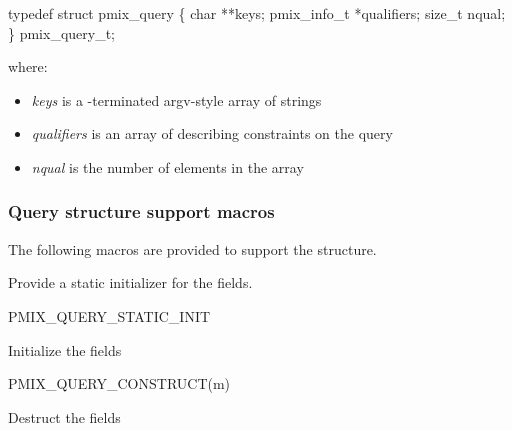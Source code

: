 \cspecificstart
\begin{codepar}
typedef struct pmix_query \{
    char **keys;
    pmix_info_t *qualifiers;
    size_t nqual;
\} pmix_query_t;
\end{codepar}
\cspecificend

where:

\begin{itemize}
    \item \emph{keys} is a -terminated argv-style array of strings
    \item \emph{qualifiers} is an array of  describing constraints on the query
    \item \emph{nqual} is the number of elements in the  array
\end{itemize}

\subsubsection{Query structure support macros}
The following macros are provided to support the  structure.


Provide a static initializer for the  fields.

\cspecificstart
\begin{codepar}
PMIX_QUERY_STATIC_INIT
\end{codepar}
\cspecificend



Initialize the  fields

\cspecificstart
\begin{codepar}
PMIX_QUERY_CONSTRUCT(m)
\end{codepar}
\cspecificend

\begin{arglist}
\end{arglist}


Destruct the  fields

